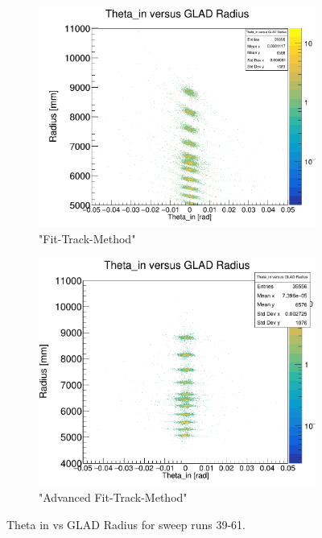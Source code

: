 \documentclass[12pt, letterpaper]{article}
\begin{document}
\begin{figure}[!htbp]
\begin{subfigure}{.5\textwidth}
\end{subfigure}
\begin{subfigure}{.5\textwidth}
  \centering
  \includegraphics[width=.9\linewidth]{plot_imgs/theta_in_rho_fit.png} 
  \caption{"Fit-Track-Method"}
  \label{fig:sub-second}
\end{subfigure}
\begin{subfigure}{.5\textwidth}
  \centering
  \includegraphics[width=.9\linewidth]{plot_imgs/theta_in_rho_alpha.png} 
  \caption{"Advanced Fit-Track-Method"}
  \label{fig:sub-second}
\end{subfigure}
\caption{Theta \textunderscore in vs GLAD Radius for sweep runs 39-61.}
\label{fig:fig}
\end{figure}
\FloatBarrier
\clearpage
\end{document}
